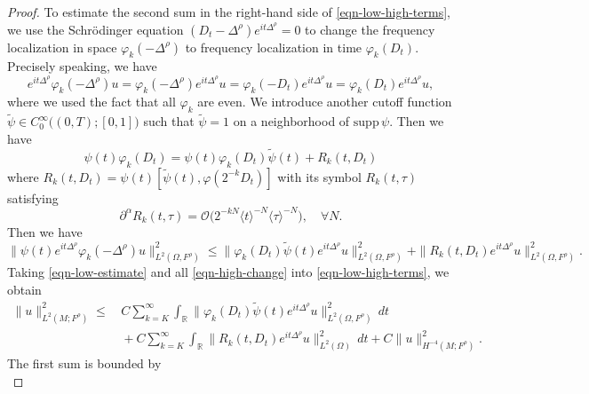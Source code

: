 \documentclass[11pt,oneside,reqno]{amsart}
\newcommand\R{\ensuremath{\mathbb{R}}}
\theoremstyle{definition}
\numberwithin{equation}{section}
\theoremstyle{plain}
\begin{document}
\begin{proof}
    To estimate the second sum in the right-hand side of \eqref{eqn-low-high-terms}, we use the Schrödinger equation $(D_t-\Delta^\rho)e^{it\Delta^\rho}=0$
    to change the frequency localization in space $\varphi_k(-\Delta^\rho)$ to frequency localization in time $\varphi_k(D_t)$. Precisely speaking, we have
    \begin{equation*}
        e^{it\Delta^\rho}\varphi_k(-\Delta^\rho) u =\varphi_k(-\Delta^\rho) e^{it \Delta^\rho} u=\varphi_k(-D_t)e^{it\Delta^\rho} u= \varphi_k(D_t)e^{it\Delta^\rho} u,
    \end{equation*}
    where we used the fact that all $\varphi_k$ are even. We introduce another cutoff function $\widetilde{\psi}\in C_0^\infty \bigl((0,T);[0,1]\bigr)$ such that $\widetilde{\psi}=1$ on a neighborhood of $\mathrm{supp}\, \psi$. Then we have
    \begin{equation*}
        \psi(t)\varphi_k(D_t)= \psi(t)\varphi_k(D_t)\widetilde{\psi}(t)+R_k(t,D_t)
    \end{equation*}
    where $R_k(t,D_t)=\psi(t) [\widetilde{\psi}(t),\varphi(2^{-k}D_t)]$ with its symbol $R_k(t,\tau)$ satisfying
    \begin{equation}
        \partial^\alpha R_k(t,\tau)=\mathcal{O} \bigl( 2^{-kN}\langle t\rangle^{-N}\langle \tau\rangle^{-N} \bigr),\quad \forall N.\label{eqn-symbol-estimate}
    \end{equation}
    Then we have
    \begin{equation}
        \|\psi(t)e^{it\Delta^\rho }\varphi_k(-\Delta^\rho)u\|^2_{L^2(\Omega,F^\rho)} \le \|\varphi_k(D_t)\widetilde{\psi}(t)e^{it\Delta^\rho }u\|^2_{L^2(\Omega,F^\rho)}+ \| R_k(t,D_t)e^{it\Delta^\rho} u\|^2_{L^2(\Omega,F^\rho)}.\label{eqn-high-change}
    \end{equation}
    Taking \eqref{eqn-low-estimate} and all \eqref{eqn-high-change} into \eqref{eqn-low-high-terms}, we obtain
    \begin{equation}
        \begin{aligned}
            \|u\|^2_{L^2(M;F^\rho )}\le &\, C\sum_{k=K}^\infty \int_\R \|\varphi_k(D_t) \widetilde{\psi}(t)e^{it\Delta^\rho} u\|^2_{L^2(\Omega,F^\rho)}\,d t\\
            &\, +C \sum_{k=K}^\infty \int_\R \|R_k(t,D_t) e^{it\Delta^\rho} u\|^2_{L^2(\Omega)} \,d t + C\|u\|^2_{H^{-4}(M;F^{\rho})}.
        \end{aligned}\label{eqn-low-high-2}
    \end{equation}
    The first sum is bounded by
    \begin{equation}

\end{equation}
\end{proof}
\end{document}
